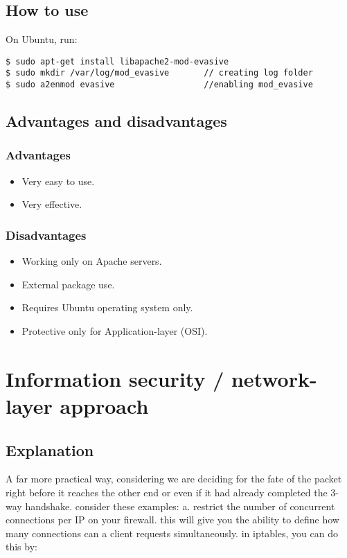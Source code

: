\documentclass{report}
\begin{document}
\subsection {How to use}
On Ubuntu, run:
\begin{lstlisting}[frame=single]
$ sudo apt-get install libapache2-mod-evasive
$ sudo mkdir /var/log/mod_evasive       // creating log folder
$ sudo a2enmod evasive                  //enabling mod_evasive
\end{lstlisting}

\subsection {Advantages and disadvantages }
\subsubsection{Advantages} 
\begin{itemize}
\item Very easy to use.
\item Very effective.
\end{itemize}
\subsubsection{Disadvantages}
\begin{itemize}
\item Working only on Apache servers.
\item External package use.
\item Requires Ubuntu operating system only.
\item Protective only for Application-layer (OSI).
\end{itemize}
\newpage
\section {Information security / network-layer approach}

\subsection {Explanation}
A far more practical way, considering we are deciding for the fate of the packet right before it reaches the other end or even if it had already completed the 3-way handshake. consider these examples:\hfill \break
a. restrict the number of concurrent connections per IP on your firewall. this will give you the ability to define how many connections can a client requests simultaneously.
in iptables, you can do this by:
\hfill \break
\end{document}
